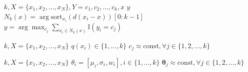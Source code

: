 \documentclass[twocolumn]{ctexart}
\begin{document}
\begin{algorithm}
  \caption{}%
  \label{al:knn}
  \begin{algorithmic}
    \REQUIRE$k, X = \{x_1, x_2, \ldots, x_N\}, Y = {c_1, c_2, \ldots, c_k}, x$
    \ENSURE$y$
    \STATE$N_k(x) = \arg\mathrm{sort}_{x_i}(d(x_i - x))[0:k - 1]$
    \STATE$y = \arg\max_{c_j}\sum_{x_i \in N_k(x)}\mathbb{I}(y_i = c_j)$
  \end{algorithmic}
\end{algorithm}
\begin{algorithm}
  \caption{}%
  \label{al:k_means}
  \begin{algorithmic}
    \REQUIRE$k, X = \{x_1, x_2, \ldots, x_N\}$
    \ENSURE$q(x_i) \in \{1, \ldots, k\}$
    \ENDFOR%
    \UNTIL$c_j \approx \mathrm{const}, \forall j \in \{1, 2, \ldots, k\}$
  \end{algorithmic}
\end{algorithm}
\begin{algorithm}
  \caption{}%
  \label{al:gmm}
  \begin{algorithmic}
    \REQUIRE$k, X = \{x_1, x_2, \ldots, x_N\}$
    \ENSURE$\theta_i = [\mu_i, \sigma_i, w_i], i \in \{1, \ldots, k\}$
    \ENDFOR%
    \UNTIL$\mathbf{\theta}_j \approx \mathrm{const}, \forall j \in \{1, 2, \ldots, k\}$
  \end{algorithmic}
\end{algorithm}
\end{document}
